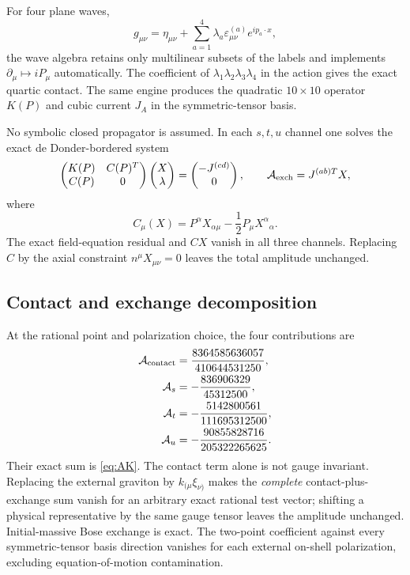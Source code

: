 \documentclass[11pt]{article}
\theoremstyle{definition}
\theoremstyle{remark}
\begin{document}
For four plane waves,
\begin{equation}
g_{\mu\nu}=\eta_{\mu\nu}
+\sum_{a=1}^{4}\lambda_a\varepsilon^{(a)}_{\mu\nu}e^{ip_a\cdot x},
\end{equation}
the wave algebra retains only multilinear subsets of the labels and
implements $\partial_\mu\mapsto iP_\mu$ automatically.  The coefficient
of $\lambda_1\lambda_2\lambda_3\lambda_4$ in the action gives the exact
quartic contact.  The same engine produces the quadratic $10\times10$
operator $K(P)$ and cubic current $J_A$ in the symmetric-tensor basis.

No symbolic closed propagator is assumed.  In each $s,t,u$ channel one
solves the exact de Donder-bordered system
\begin{equation}\label{eq:bordered}
\begin{pmatrix}K(P)&C(P)^T\\ C(P)&0\end{pmatrix}
\begin{pmatrix}X\\ \lambda\end{pmatrix}
=\begin{pmatrix}-J^{(cd)}\\0\end{pmatrix},
\qquad
\mathcal A_{\rm exch}=J^{(ab)T}X,
\end{equation}
where
\begin{equation}
C_\mu(X)=P^\alpha X_{\alpha\mu}-\frac12P_\mu X^\alpha{}_\alpha.
\end{equation}
The exact field-equation residual and $CX$ vanish in all three channels.
Replacing $C$ by the axial constraint $n^\mu X_{\mu\nu}=0$ leaves the
total amplitude unchanged.

\subsection{Contact and exchange decomposition}

At the rational point and polarization choice, the four contributions
are
\begin{align}\label{eq:pieces}
\mathcal A_{\rm contact}&=
\frac{8364585636057}{410644531250},\nonumber\\
\mathcal A_s&=-\frac{836906329}{45312500},\nonumber\\
\mathcal A_t&=-\frac{5142800561}{111695312500},\nonumber\\
\mathcal A_u&=-\frac{90855828716}{205322265625}.
\end{align}
Their exact sum is \eqref{eq:AK}.  The contact term alone is not gauge
invariant.  Replacing the external graviton by
$k_{(\mu}\xi_{\nu)}$ makes the \emph{complete} contact-plus-exchange
sum vanish for an arbitrary exact rational test vector; shifting a
physical representative by the same gauge tensor leaves the amplitude
unchanged.  Initial-massive Bose exchange is exact.  The two-point
coefficient against every symmetric-tensor basis direction vanishes for
each external on-shell polarization, excluding equation-of-motion
contamination.
\end{document}
